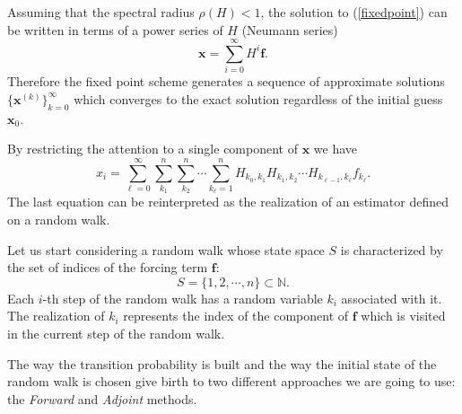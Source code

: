 \documentclass[a4paper,10pt]{article}
\begin{document}
Assuming that the spectral radius $\rho(H)<1$, the solution to 
(\ref{fixedpoint}) can be written in terms of a power series of 
$H$ (Neumann series)
\[
\mathbf{x}=\sum_{i=0}^\infty H^i\mathbf{f}.
\]
Therefore the fixed point scheme generates a sequence of approximate solutions
$\{\mathbf{x}^{(k)}\}_{k=0}^{\infty}$ which converges to the exact solution 
regardless of the initial guess $\mathbf{x}_0$.

By restricting the attention to a single component of $\mathbf{x}$ we 
have
\begin{equation}
x_i=\sum_{\ell=0}^\infty \sum_{k_1}^n\sum_{k_2}^n\cdots \sum_{k_{\ell}=1}^n 
H_{k_0,k_1}H_{k_1,k_2}\cdots H_{k_{\ell-1}, k_{\ell}}f_{k_{\ell}}.
\label{forward}
\end{equation}
The last equation can be reinterpreted as the realization of an estimator 
defined on a random walk. 

Let us start considering a random walk whose 
state space $S$ is characterized by the set of indices of the forcing term 
$\mathbf{f}$: 
\[
S=\{1,2,\cdots, n\} \subset \mathbb{N}.
\]
Each $i$-th step of the random walk has a random variable 
$k_i$ associated with it. The realization of $k_i$ represents the index of the 
component of $\mathbf{f}$ 
which is visited in the current step of the random walk.

The way the transition probability is built and the way the initial state of 
the random walk is chosen give birth to two different approaches we are 
going to use: the \textit{Forward} and \textit{Adjoint} methods.
\end{document}
